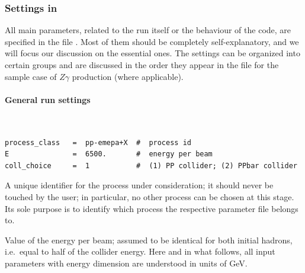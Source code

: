 \documentclass[english,11pt]{article}
\begin{document}
\subsubsection{Settings in }\label{sec:parameter}

All main parameters, related to the run itself or the behaviour of the code, 
are specified in the file . Most of them should be completely 
self-explanatory, and we will focus our discussion on the essential ones. The 
settings can be organized into certain groups and are discussed in the order 
they appear in the file  for the sample case of $Z\gamma$ production (where applicable).

\paragraph{General run settings}\label{sec:gensettings}
\lstset{basicstyle=\scriptsize, frame=single}
{\tt
\begin{lstlisting}
process_class   =  pp-emepa+X  #  process id
E               =  6500.       #  energy per beam
coll_choice     =  1           #  (1) PP collider; (2) PPbar collider
\end{lstlisting}
}

\quad A unique identifier for the process under consideration; 
it should never be touched by the user; in particular, no other process can be 
chosen at this stage. Its sole purpose is to identify which process the respective 
parameter file belongs to.


\quad Value of the energy per beam; assumed to be identical for both initial hadrons, i.e.\ equal to half of the collider energy. Here and in what follows, all input parameters with energy dimension 
are understood in units of GeV.
\end{document}

